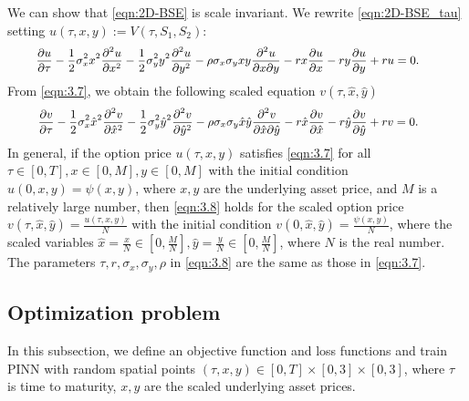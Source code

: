 \documentclass[11pt,reqno]{article}
\numberwithin{equation}{section}
\begin{document}
{We can show that \eqref{eqn:2D-BSE} is scale invariant. We rewrite \eqref{eqn:2D-BSE_tau} setting
$u(\tau, x, y):=V(\tau,S_1,S_2)$:
\begin{equation}\label{eqn:3.7}\small
\begin{aligned}
  \hspace{-5mm}\frac{\partial u}{\partial \tau}
    - \frac{1}{2} \sigma_x^2 x^2 \frac{\partial^2 u}{\partial x^2}
    - \frac{1}{2} \sigma_y^2 y^2 \frac{\partial^2 u}{\partial y^2} %
    - \rho \sigma_x \sigma_y x y \frac{\partial^2 u}{\partial x \partial y} 
    - r x \frac{\partial u}{\partial x} 
    - r y \frac{\partial u}{\partial y}
    + ru
    = 0.
\end{aligned}
\end{equation}
From \eqref{eqn:3.7}, we obtain the following scaled equation $v(\tau,\hat{x},\hat{y})$
\begin{equation}\label{eqn:3.8}\small
\begin{aligned}
\hspace{-5mm}\frac{\partial v}{\partial \tau}
    - \frac{1}{2} \sigma_x^2 \hat{x}^2 \frac{\partial^2 v}{\partial \hat{x}^2}
    - \frac{1}{2} \sigma_y^2 \hat{y}^2 \frac{\partial^2 v}{\partial \hat{y}^2} %
    - \rho \sigma_x \sigma_y \hat{x} \hat{y} \frac{\partial^2 v}{\partial \hat{x} \partial \hat{y}} 
    - r \hat{x} \frac{\partial v}{\partial \hat{x}}
    - r \hat{y} \frac{\partial v}{\partial \hat{y}}
    + rv
    = 0.
\end{aligned}
\end{equation}
In general, if the option price $u(\tau,x,y)$ satisfies \eqref{eqn:3.7}
 for all $\tau \in [0, T], x \in [0, M], y \in [0,M]$ 
 with the initial condition $u(0,x,y) = \psi(x,y)$,
 where $x,y$ are the underlying asset price, and $M$ is a relatively large number,
  then \eqref{eqn:3.8} holds for the scaled option price 
  $v(\tau,\hat{x},\hat{y}) =\frac{u(\tau,x, y)}{N}$
   with the initial condition $v(0,\hat{x},\hat{y}) = \frac{\psi(x,y)}{N}$, 
  where the scaled variables
  $\hat{x} = \frac{x}{N} \in [0, \frac{M}{N}], \hat{y} = \frac{y}{N} \in [0, \frac{M}{N}]$,
   where $N$ is the real number.
The parameters $\tau, r, \sigma_x, \sigma_y, \rho$ in \eqref{eqn:3.8}
     are the same as those in \eqref{eqn:3.7}.  

\subsection{Optimization problem}
In this subsection, we define an objective function and loss functions and
 train PINN with random spatial points $(\tau, x, y) \in [0,T] \times[0,3] \times [0,3]$,
  where $\tau$ is time to maturity, $x, y$ are the scaled underlying asset prices.

}
\end{document}
